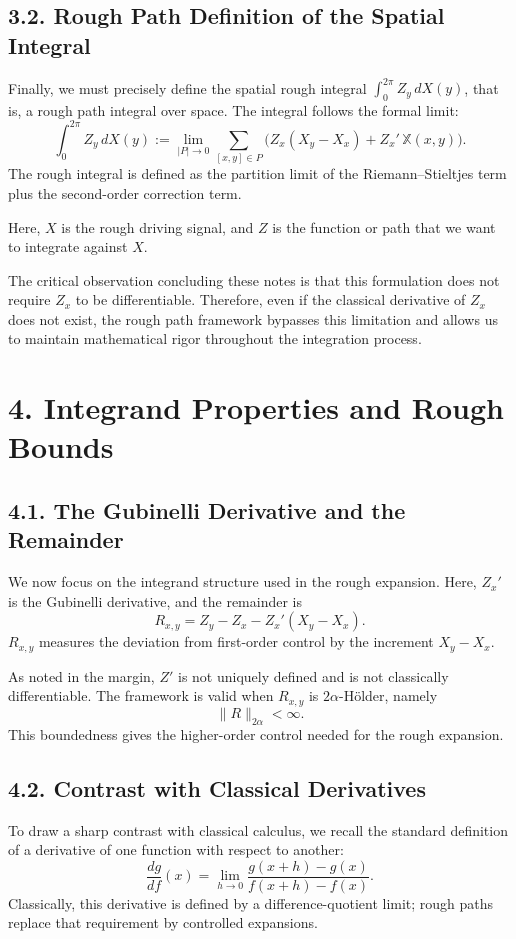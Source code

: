 \documentclass[11pt]{article}
\theoremstyle{definition}
\theoremstyle{remark}
\begin{document}
\subsection*{3.2. Rough Path Definition of the Spatial Integral}
Finally, we must precisely define the spatial rough integral $\int_0^{2\pi} Z_y\,dX(y)$, that is, a rough path integral over space. The integral follows the formal limit:
\[
\int_0^{2\pi} Z_y\,dX(y)
:=
\lim_{|P|\to0}
\sum_{[x,y]\in P}
\bigl(Z_x(X_y-X_x)+Z_x'\,\mathbb X(x,y)\bigr).
\]
The rough integral is defined as the partition limit of the Riemann--Stieltjes term plus the second-order correction term.

Here, $X$ is the rough driving signal, and $Z$ is the function or path that we want to integrate against $X$.

The critical observation concluding these notes is that this formulation does not require $Z_x$ to be differentiable. Therefore, even if the classical derivative of $Z_x$ does not exist, the rough path framework bypasses this limitation and allows us to maintain mathematical rigor throughout the integration process.

\section*{4. Integrand Properties and Rough Bounds}
\subsection*{4.1. The Gubinelli Derivative and the Remainder}
We now focus on the integrand structure used in the rough expansion. Here, $Z_x'$ is the Gubinelli derivative, and the remainder is
\[
R_{x,y}=Z_y-Z_x-Z_x'(X_y-X_x).
\]
$R_{x,y}$ measures the deviation from first-order control by the increment $X_y-X_x$.

As noted in the margin, $Z'$ is not uniquely defined and is not classically differentiable. The framework is valid when $R_{x,y}$ is $2\alpha$-H\"older, namely
\[
\|R\|_{2\alpha}<\infty.
\]
This boundedness gives the higher-order control needed for the rough expansion.

\subsection*{4.2. Contrast with Classical Derivatives}
To draw a sharp contrast with classical calculus, we recall the standard definition of a derivative of one function with respect to another:
\[
\frac{dg}{df}(x)=\lim_{h\to0}\frac{g(x+h)-g(x)}{f(x+h)-f(x)}.
\]
Classically, this derivative is defined by a difference-quotient limit; rough paths replace that requirement by controlled expansions.
\end{document}
